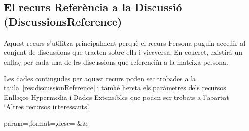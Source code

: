 \subsection{El recurs Referència a la Discussió (DiscussionsReference)}

    \paragraph{}
    Aquest recurs s'utilitza principalment perquè el recurs Persona puguin accedir al conjunt de discussions que tracten sobre ella i viceversa. En concret, existirà un enllaç per cada una de les discussions que referenciïn a la mateixa persona.

    Les dades contingudes per aquest recurs poden ser trobades a la taula~\ref{res:discussionReference} i també hereta els paràmetres dels recursos Enllaços Hypermedia i Dades Extensibles que poden ser trobats a l'apartat `Altres recursos interessants'.

    \begin{center}
             {param=\param,format=\format,desc=\desc}
             {\param&\format&\desc}
     \end{center}
